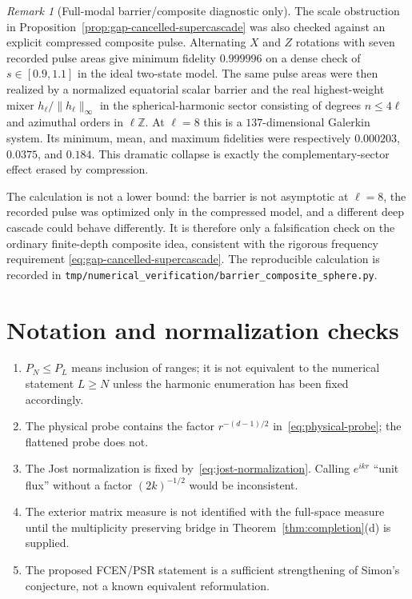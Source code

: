 \documentclass[11pt]{article}
\theoremstyle{definition}
\theoremstyle{remark}
\newtheorem{remark}[theorem]{Remark}
\begin{document}
\begin{remark}[Full-modal barrier/composite diagnostic only]
The scale obstruction in Proposition~\ref{prop:gap-cancelled-supercascade} was
also checked against an explicit compressed composite pulse.  Alternating
$X$ and $Z$ rotations with seven recorded pulse areas give minimum fidelity
$0.999996$ on a dense check of $s\in[0.9,1.1]$ in the ideal two-state model.
The same pulse areas were then realized by a normalized equatorial scalar
barrier and the real highest-weight mixer $h_\ell/\|h_\ell\|_\infty$ in the
spherical-harmonic sector consisting of degrees $n\leq4\ell$ and azimuthal
orders in $\ell\mathbb Z$.  At $\ell=8$ this is a $137$-dimensional Galerkin
system.  Its minimum, mean, and maximum fidelities were respectively
$0.000203$, $0.0375$, and $0.184$.  This dramatic collapse is exactly the
complementary-sector effect erased by compression.

The calculation is not a lower bound: the barrier is not asymptotic at
$\ell=8$, the recorded pulse was optimized only in the compressed model, and
a different deep cascade could behave differently.  It is therefore only a
falsification check on the ordinary finite-depth composite idea, consistent
with the rigorous frequency requirement
\eqref{eq:gap-cancelled-supercascade}.  The reproducible calculation is
recorded in
\nolinkurl{tmp/numerical_verification/barrier_composite_sphere.py}.
\end{remark}



\section{Notation and normalization checks}

\begin{enumerate}[label=(\roman*)]
 \item $P_N\leq P_L$ means inclusion of ranges; it is not equivalent to the numerical statement $L\geq N$ unless the harmonic enumeration has been fixed accordingly.
 \item The physical probe contains the factor $r^{-(d-1)/2}$ in~\eqref{eq:physical-probe}; the flattened probe does not.
 \item The Jost normalization is fixed by~\eqref{eq:jost-normalization}.  Calling $e^{ikr}$ ``unit flux'' without a factor $(2k)^{-1/2}$ would be inconsistent.
 \item The exterior matrix measure is not identified with the full-space measure until the multiplicity preserving bridge in Theorem~\ref{thm:completion}(d) is supplied.
 \item The proposed FCEN/PSR statement is a sufficient strengthening of Simon's conjecture, not a known equivalent reformulation.
\end{enumerate}
\end{document}

